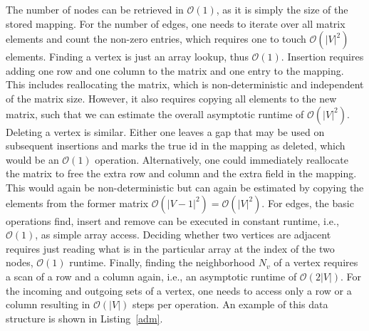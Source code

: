             The number of nodes can be retrieved in $\mathcal{O}(1)$, as it is simply the size of the stored mapping.
            For the number of edges, one needs to iterate over all matrix elements and count the non-zero entries, which requires one to touch $\mathcal{O}(|V|^2)$ elements.
            Finding a vertex is just an array lookup, thus $\mathcal{O}(1)$.
            Insertion requires adding one row and one column to the matrix and one entry to the mapping. 
            This includes reallocating the matrix, which is non-deterministic and independent of the matrix size. However, it also requires copying all elements to the new matrix, such that we can estimate the overall asymptotic runtime of $\mathcal{O}(|V|^2)$.
            Deleting a vertex is similar. Either one leaves a gap that may be used on subsequent insertions and marks the true id in the mapping as deleted, which would be an $\mathcal{O}(1)$ operation. 
            Alternatively, one could immediately reallocate the matrix to free the extra row and column and the extra field in the mapping. 
            This would again be non-deterministic but can again be estimated by copying the elements from the former matrix $\mathcal{O}(|V-1|^2) = \mathcal{O}(|V|^2)$.
            For edges, the basic operations find, insert and remove can be executed in constant runtime, i.e., $\mathcal{O}(1)$, as simple array access.
            Deciding whether two vertices are adjacent requires just reading what is in the particular array at the index of the two nodes, $\mathcal{O}(1)$ runtime.
            Finally, finding the neighborhood $N_v$ of a vertex requires a scan of a row and a column again, i.e., an asymptotic runtime of $\mathcal{O}(2|V|)$. For the incoming and outgoing sets of a vertex, one needs to access only a row or a column resulting in $\mathcal{O}(|V|)$ steps per operation.
            An example of this data structure is shown in Listing~\ref{adm}.

